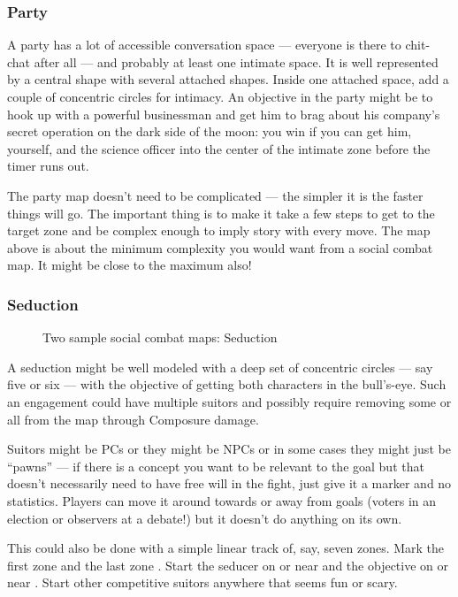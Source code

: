 \subsubsection{Party}

A party has a lot of accessible conversation space --- everyone is there to chit-chat after all --- and probably at least one intimate space. It is well represented by a central shape with several attached shapes. Inside one attached space, add a couple of concentric circles for intimacy. An objective in the party might be to hook up with a powerful businessman and get him to brag about his company's secret operation on the dark side of the moon: you win if you can get him, yourself, and the science officer into the center of the intimate zone before the timer runs out.

The party map doesn't need to be complicated --- the simpler it is the faster things will go. The important thing is to make it take a few steps to get to the target zone and be complex enough to imply story with every move. The map above is about the minimum complexity you would want from a social combat map. It might be close to the maximum also!

\subsubsection{Seduction}

\begin{figure}
\centering\footnotesize

\caption{Two sample social combat maps: Seduction}
\label{fig:social-combat-map-seduction}
\end{figure}


A seduction might be well modeled with a deep set of concentric circles --- say five or six --- with the objective of getting both characters in the bull's-eye. Such an engagement could have multiple suitors and possibly require removing some or all from the map through Composure damage.

Suitors might be PCs or they might be NPCs or in some cases they might just be ``pawns'' --- if there is a concept you want to be relevant to the goal but that doesn't necessarily need to have free will in the fight, just give it a marker and no statistics. Players can move it around towards or away from goals (voters in an election or observers at a debate!) but it doesn't do anything on its own.

This could also be done with a simple linear track of, say, seven zones. Mark the first zone \LOVERS{} and the last zone \JUSTFRIENDS{}. Start the seducer on or near \LOVERS{} and the objective on or near \JUSTFRIENDS{}. Start other competitive suitors anywhere that seems fun or scary.

